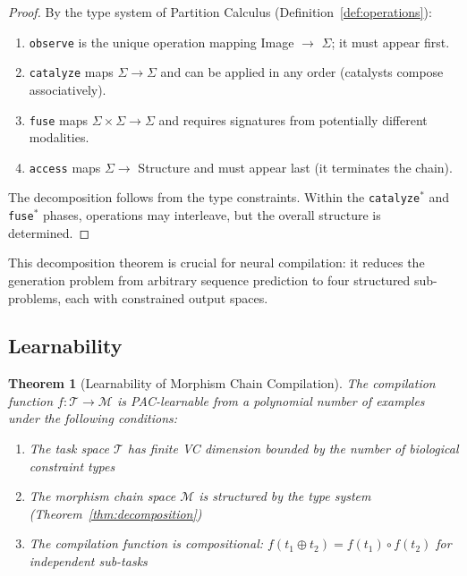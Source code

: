 \documentclass[11pt,a4paper]{article}
\newtheorem{theorem}{Theorem}[section]
\theoremstyle{definition}
\theoremstyle{remark}
\newcommand{\Sig}{\Sigma}
\begin{document}
\begin{proof}
By the type system of Partition Calculus (Definition~\ref{def:operations}):
\begin{enumerate}
    \item \texttt{observe} is the unique operation mapping Image $\to$ $\Sig$; it must appear first.
    \item \texttt{catalyze} maps $\Sig \to \Sig$ and can be applied in any order (catalysts compose associatively).
    \item \texttt{fuse} maps $\Sig \times \Sig \to \Sig$ and requires signatures from potentially different modalities.
    \item \texttt{access} maps $\Sig \to$ Structure and must appear last (it terminates the chain).
\end{enumerate}
The decomposition follows from the type constraints. Within the \texttt{catalyze}$^*$ and \texttt{fuse}$^*$ phases, operations may interleave, but the overall structure is determined.
\end{proof}

This decomposition theorem is crucial for neural compilation: it reduces the generation problem from arbitrary sequence prediction to four structured sub-problems, each with constrained output spaces.

\subsection{Learnability}

\begin{theorem}[Learnability of Morphism Chain Compilation]
\label{thm:learnability}
The compilation function $f: \mathcal{T} \to \mathcal{M}$ is PAC-learnable from a polynomial number of examples under the following conditions:
\begin{enumerate}
    \item The task space $\mathcal{T}$ has finite VC dimension bounded by the number of biological constraint types
    \item The morphism chain space $\mathcal{M}$ is structured by the type system (Theorem~\ref{thm:decomposition})
    \item The compilation function is compositional: $f(t_1 \oplus t_2) = f(t_1) \circ f(t_2)$ for independent sub-tasks
\end{enumerate}
\end{theorem}
\end{document}
